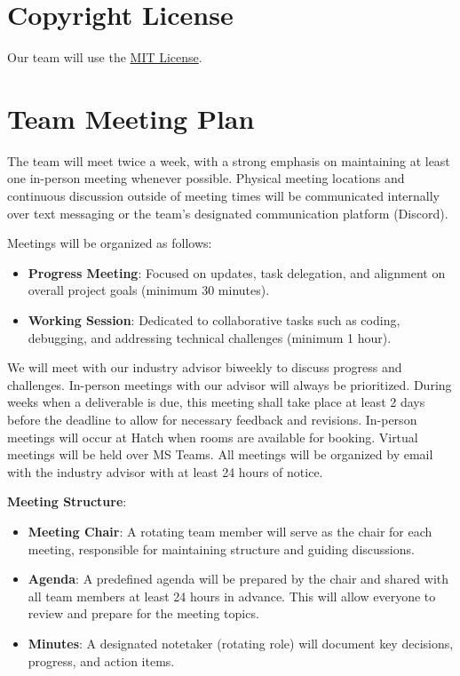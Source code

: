 \documentclass{article}
\begin{document}
\section{Copyright License}
Our team will use the \href{https://github.com/dcheung11/team-6-capstone-project/blob/main/LICENSE}{MIT License}.

\section{Team Meeting Plan}
The team will meet twice a week, with a strong emphasis on maintaining at least one in-person meeting whenever possible. Physical meeting locations and continuous discussion outside of meeting times will be communicated internally over text messaging or the team’s designated communication platform (Discord).

Meetings will be organized as follows:

\begin{itemize}
  \item \textbf{Progress Meeting}: Focused on updates, task delegation, and alignment on overall project goals (minimum 30 minutes).
  \item \textbf{Working Session}: Dedicated to collaborative tasks such as coding, debugging, and addressing technical challenges (minimum 1 hour).
\end{itemize}

We will meet with our industry advisor biweekly to discuss progress and challenges. In-person meetings with our advisor will always be prioritized. During weeks when a deliverable is due, this meeting shall take place at least 2 days before the deadline to allow for necessary feedback and revisions. In-person meetings will occur at Hatch when rooms are available for booking. Virtual meetings will be held over MS Teams. All meetings will be organized by email with the industry advisor with at least 24 hours of notice.

\textbf{Meeting Structure}:
\begin{itemize}
  \item \textbf{Meeting Chair}: A rotating team member will serve as the chair for each meeting, responsible for maintaining structure and guiding discussions.
  \item \textbf{Agenda}: A predefined agenda will be prepared by the chair and shared with all team members at least 24 hours in advance. This will allow everyone to review and prepare for the meeting topics.
  \item \textbf{Minutes}: A designated notetaker (rotating role) will document key decisions, progress, and action items.
\end{itemize}
\end{document}
